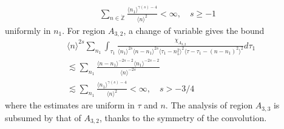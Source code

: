 \documentclass[12pt,reqno]{amsart}
\numberwithin{equation}{section}  %
\newcommand{\zz}{\mathbb{Z}}
\newcommand{\zzdot}{\dot{\zz}}
\begin{document}
  \begin{equation*}
  \begin{split}
    \sum_{n \in \zzdot} \frac{\langle n_{1}\rangle ^{\gamma(s)-4}}{\langle n \rangle^{2}} < \infty, \quad s \ge -1
  \end{split}
  \end{equation*}
  uniformly in $n_{1}$.
  For region $A_{3,2}$, a change of variable gives the bound 
\begin{equation}
  \begin{split}
    & \langle n
    \rangle ^{2s}
    \sum_{n_{1}} \int_{\tau_{1}} \frac{\chi_{A_{3,2}}}{\langle n_{1} \rangle ^{2s} \langle n-n_{1} \rangle ^{2s} 
    \langle \tau_{1} - n_{1}^{2} \rangle^{2} \langle  \tau - \tau_{1} - (n - n_{1})^{2} \rangle^{2}}
    d \tau_1 
    \\
    & \lesssim \sum_{n_{1}} \frac{\langle n - n_{1} \rangle ^{-2s-2} \langle n_{1} \rangle ^{-2s-2}}{\langle
    n\rangle ^{-2s}}  
    \\
    & \lesssim \sum_{n_{1}} \frac{\langle n_{1}\rangle ^{\gamma(s)-4}}{\langle n \rangle^{2}} < \infty, \quad s > -3/4
  \end{split}
\end{equation}
where the estimates are uniform in $\tau$ and $n$. The analysis of region $A_{3,3}$ is subsumed by that of $A_{3,2}$, thanks to the symmetry of the convolution.
%
\end{document}
